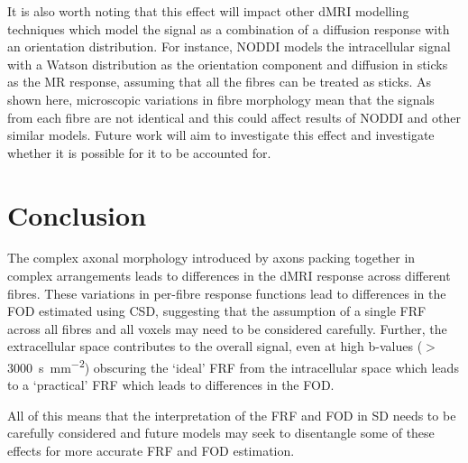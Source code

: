 It is also worth noting that this effect will impact other \ac{dMRI} modelling techniques which model the signal as a combination of a diffusion response with an orientation distribution. For instance, \ac{NODDI} \cite{Zhang2012} models the intracellular signal with a Watson distribution as the orientation component and diffusion in sticks as the MR response, assuming that all the fibres can be treated as sticks.
As shown here, microscopic variations in fibre morphology mean that the signals from each fibre are not identical and this could affect results of \ac{NODDI} and other similar models.
Future work will aim to investigate this effect and investigate whether it is possible for it to be accounted for.

\section{Conclusion}
\label{sec:frf_conclusion}
The complex axonal morphology introduced by axons packing together in complex arrangements leads to differences in the \ac{dMRI} response across different fibres.
These variations in per-fibre response functions lead to differences in the \ac{FOD} estimated using \acl{CSD}, suggesting that the assumption of a single \ac{FRF} across all fibres and all voxels may need to be considered carefully.
Further, the extracellular space contributes to the overall signal, even at high b-values ($>$\SI{3000}{\second\per\milli\metre\squared}) obscuring the `ideal' \ac{FRF} from the intracellular space which leads to a `practical' \ac{FRF} which leads to differences in the \ac{FOD}.

All of this means that the interpretation of the \ac{FRF} and \ac{FOD} in \acl{SD} needs to be carefully considered and future models may seek to disentangle some of these effects for more accurate \ac{FRF} and \ac{FOD} estimation. 


